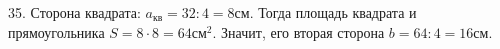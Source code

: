 35. Сторона квадрата: $a_{\text{кв}}=32:4=8$см. Тогда площадь квадрата и прямоугольника $S=8\cdot8=64\text{см}^2.$ Значит, его вторая сторона $b=64:4=16$см.\\
